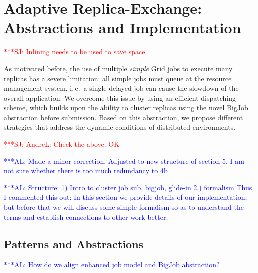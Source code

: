 \documentclass{rspublic}
\newcommand{\alnote}[1]{ {\textcolor{blue} { ***AL: #1 }}}
\newcommand{\jhanote}[1]{ {\textcolor{red} { ***SJ: #1 }}}
\newcommand{\alnote}[1]{}
\newcommand{\jhanote}[1]{}
\begin{document}

\section{Adaptive Replica-Exchange: Abstractions and Implementation}
\label{sec:glidein}
\jhanote{Inlining needs to be used to save space}

As motivated before, the use of multiple {\it simple} Grid jobs to
execute many replicas has a severe limitation: all simple jobs must
queue at the resource management system, i.\,e.\ a single delayed
job can cause the slowdown of the overall application.  We overcome
this issue by using an efficient dispatching scheme, which builds upon
the ability to cluster replicas using the novel BigJob abstraction
before submission. Based on this abstraction, we propose different
strategies that address the dynamic conditions of distributed
environments.

\jhanote{AndreL: Check the above. OK}

\alnote{Made a minor correction. Adjusted to new structure of section
  5. I am not sure whether there is too much redundancy to 4b}


\alnote{Structure: 1) Intro to cluster job sub, bigjob, glide-in 2.)
  formalism Thus, I commented this out: In this section we provide
  details of our implementation, but before that we will discuss some
  simple formalism so as to understand the terms and establish
  connections to other work better.  }

               
\subsection{Patterns and Abstractions}
\alnote{How do we align enhanced job model and BigJob abstraction?}
\end{document}
